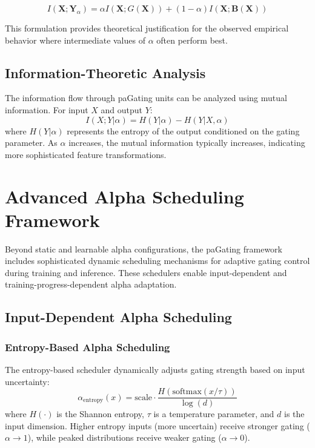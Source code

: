 \documentclass[lettersize,journal]{IEEEtran}
\begin{document}
\begin{equation}
I(\mathbf{X}; \mathbf{Y}_\alpha) = \alpha I(\mathbf{X}; G(\mathbf{X})) + (1-\alpha) I(\mathbf{X}; \mathbf{B}(\mathbf{X}))
\end{equation}

This formulation provides theoretical justification for the observed empirical behavior where intermediate values of $\alpha$ often perform best.

\subsection{Information-Theoretic Analysis}

The information flow through paGating units can be analyzed using mutual information. For input $X$ and output $Y$:
\begin{equation}
I(X;Y|\alpha) = H(Y|\alpha) - H(Y|X,\alpha)
\end{equation}
where $H(Y|\alpha)$ represents the entropy of the output conditioned on the gating parameter. As $\alpha$ increases, the mutual information typically increases, indicating more sophisticated feature transformations.

\section{Advanced Alpha Scheduling Framework}
\label{sec:alpha_scheduling}

Beyond static and learnable alpha configurations, the paGating framework includes sophisticated dynamic scheduling mechanisms for adaptive gating control during training and inference. These schedulers enable input-dependent and training-progress-dependent alpha adaptation.

\subsection{Input-Dependent Alpha Scheduling}

\subsubsection{Entropy-Based Alpha Scheduling}
The entropy-based scheduler dynamically adjusts gating strength based on input uncertainty:
\begin{equation}
\alpha_{\text{entropy}}(x) = \text{scale} \cdot \frac{H(\text{softmax}(x/\tau))}{\log(d)}
\end{equation}
where $H(\cdot)$ is the Shannon entropy, $\tau$ is a temperature parameter, and $d$ is the input dimension. Higher entropy inputs (more uncertain) receive stronger gating ($\alpha \to 1$), while peaked distributions receive weaker gating ($\alpha \to 0$).
\end{document}
